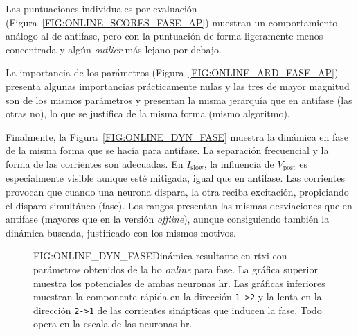 Las puntuaciones individuales por evaluación (Figura~\ref{FIG:ONLINE_SCORES_FASE_AP}) muestran un comportamiento análogo al de antifase, pero con la puntuación de forma ligeramente menos concentrada y algún \textit{outlier} más lejano por debajo.

La importancia de los parámetros (Figura~\ref{FIG:ONLINE_ARD_FASE_AP}) presenta algunas importancias prácticamente nulas y las tres de mayor magnitud son de los mismos parámetros y presentan la misma jerarquía que en antifase (las otras no), lo que se justifica de la misma forma (mismo algoritmo).

Finalmente, la Figura~\ref{FIG:ONLINE_DYN_FASE} muestra la dinámica en fase de la misma forma que se hacía para antifase. La separación frecuencial y la forma de las corrientes son adecuadas. En $I_{\mathrm{slow}}$, la influencia de $V_{\mathrm{post}}$ es especialmente visible aunque esté mitigada, igual que en antifase. Las corrientes provocan que cuando una neurona dispara, la otra reciba excitación, propiciando el disparo simultáneo (fase). Los rangos presentan las mismas desviaciones que en antifase (mayores que en la versión \textit{offline}), aunque consiguiendo también la dinámica buscada, justificado con los mismos motivos.

\begin{figure}[Potenciales de membrana y corriente sináptica en la dinámica resultante de la \acl{bo} \textit{online} en fase]{FIG:ONLINE_DYN_FASE}{Dinámica resultante en \ac{rtxi} con parámetros obtenidos de la \ac{bo} \textit{online} para fase. La gráfica superior muestra los potenciales de ambas neuronas \ac{hr}. Las gráficas inferiores muestran la componente rápida en la dirección \texttt{1->2} y la lenta en la dirección \texttt{2->1} de las corrientes sinápticas que inducen la fase. Todo opera en la escala de las neuronas \ac{hr}.}
\end{figure}
